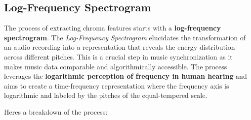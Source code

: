 \documentclass[a4paper, 9pt, twocolumn]{extarticle}
\begin{document}
\subsection{Log-Frequency Spectrogram}
The process of extracting chroma features starts with a
\textbf{log-frequency spectrogram}. The \emph{Log-Frequency Spectrogram}
elucidates the transformation of an audio recording into a
representation that reveals the energy distribution across different
pitches. This is a crucial step in music synchronization as it makes
music data comparable and algorithmically accessible.
The process leverages the \textbf{logarithmic perception of frequency in
  human hearing} and aims to create a time-frequency representation where
the frequency axis is logarithmic and labeled by the pitches of the
equal-tempered scale.

Here\textquotesingle s a breakdown of the process:
\end{document}
